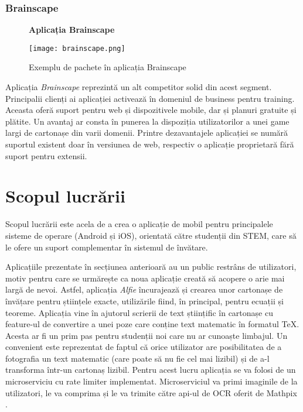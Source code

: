 \subsubsection{Brainscape}

\noindent\begin{minipage}{0.35\textwidth}
    \begin{figure}[H]
        \centering
        \textbf{Aplicația Brainscape}\par\medskip
        \texttt{[image: brainscape.png]}
        \caption{Exemplu de pachete în aplicația Brainscape \cite{brainscapeImageExample}} 
        \label{fig:exemplu_brainscape}
    \end{figure}
\end{minipage} 
\hfill
\begin{minipage}{0.55\textwidth}
    Aplicația \textit{Brainscape} \cite{brainscape} reprezintă un alt competitor solid din acest segment. Principalii clienți ai aplicației activează în domeniul de business pentru training. Aceasta oferă suport pentru web și dispozitivele mobile, dar și planuri gratuite și plătite. Un avantaj ar consta în punerea la dispoziția utilizatorilor a unei game largi de cartonașe din varii domenii. Printre dezavantajele aplicației se numără suportul existent doar în versiunea de web, respectiv o aplicație proprietară fără suport pentru extensii.
\end{minipage}

\section{Scopul lucrării}

Scopul lucrării este acela de a crea o aplicație de mobil pentru principalele sisteme de operare (Android și iOS), orientată către studenții din STEM, care să le ofere un suport complementar în sistemul de învătare.

Aplicațiile prezentate în secțiunea anterioară au un public restrâns de utilizatori, motiv pentru care se urmărește ca noua aplicație creată să acopere o arie mai largă de nevoi. Astfel, aplicația \textit{Alfie} încurajează și crearea unor cartonașe de învățare pentru științele exacte, utilizările fiind, în principal, pentru ecuații și teoreme. Aplicația vine în ajutorul scrierii de text științific în cartonașe cu feature-ul de convertire a unei poze care conține text matematic în formatul TeX. Acesta ar fi un prim pas pentru studenții noi care nu ar cunoaște limbajul. Un convenient este reprezentat de faptul că orice utilizator are posibilitatea de a fotografia un text matematic (care poate să nu fie cel mai lizibil) și de a-l transforma într-un cartonaș lizibil. Pentru acest lucru aplicația se va folosi de un microserviciu cu rate limiter implementat. Microserviciul va primi imaginile de la utilizatori, le va comprima și le va trimite către api-ul de OCR oferit de Mathpix \cite{mathpixOCR}.

